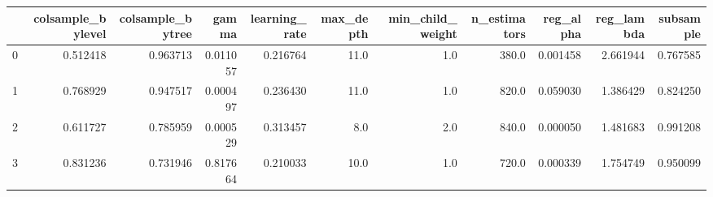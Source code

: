\begin{tabular}{lrrrrrrrrrr}
\toprule
{} &  colsample\_bylevel &  colsample\_bytree &     gamma &  learning\_rate &  max\_depth &  min\_child\_weight &  n\_estimators &  reg\_alpha &  reg\_lambda &  subsample \\
\midrule
0 &           0.512418 &          0.963713 &  0.011057 &       0.216764 &       11.0 &               1.0 &         380.0 &   0.001458 &    2.661944 &   0.767585 \\
1 &           0.768929 &          0.947517 &  0.000497 &       0.236430 &       11.0 &               1.0 &         820.0 &   0.059030 &    1.386429 &   0.824250 \\
2 &           0.611727 &          0.785959 &  0.000529 &       0.313457 &        8.0 &               2.0 &         840.0 &   0.000050 &    1.481683 &   0.991208 \\
3 &           0.831236 &          0.731946 &  0.817664 &       0.210033 &       10.0 &               1.0 &         720.0 &   0.000339 &    1.754749 &   0.950099 \\
\bottomrule
\end{tabular}
